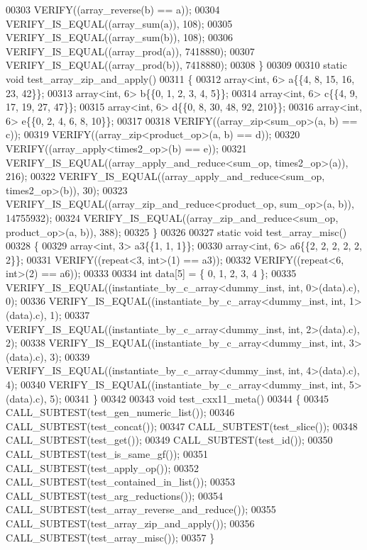 \begin{DoxyCode}
00303   VERIFY((array\_reverse(b) == a));
00304   VERIFY\_IS\_EQUAL((array\_sum(a)), 108);
00305   VERIFY\_IS\_EQUAL((array\_sum(b)), 108);
00306   VERIFY\_IS\_EQUAL((array\_prod(a)), 7418880);
00307   VERIFY\_IS\_EQUAL((array\_prod(b)), 7418880);
00308 \}
00309 
00310 \textcolor{keyword}{static} \textcolor{keywordtype}{void} test\_array\_zip\_and\_apply()
00311 \{
00312   array<int, 6> a\{\{4, 8, 15, 16, 23, 42\}\};
00313   array<int, 6> b\{\{0, 1, 2, 3, 4, 5\}\};
00314   array<int, 6> c\{\{4, 9, 17, 19, 27, 47\}\};
00315   array<int, 6> d\{\{0, 8, 30, 48, 92, 210\}\};
00316   array<int, 6> e\{\{0, 2, 4, 6, 8, 10\}\};
00317 
00318   VERIFY((array\_zip<sum\_op>(a, b) == c));
00319   VERIFY((array\_zip<product\_op>(a, b) == d));
00320   VERIFY((array\_apply<times2\_op>(b) == e));
00321   VERIFY\_IS\_EQUAL((array\_apply\_and\_reduce<sum\_op, times2\_op>(a)), 216);
00322   VERIFY\_IS\_EQUAL((array\_apply\_and\_reduce<sum\_op, times2\_op>(b)), 30);
00323   VERIFY\_IS\_EQUAL((array\_zip\_and\_reduce<product\_op, sum\_op>(a, b)), 14755932);
00324   VERIFY\_IS\_EQUAL((array\_zip\_and\_reduce<sum\_op, product\_op>(a, b)), 388);
00325 \}
00326 
00327 \textcolor{keyword}{static} \textcolor{keywordtype}{void} test\_array\_misc()
00328 \{
00329   array<int, 3> a3\{\{1, 1, 1\}\};
00330   array<int, 6> a6\{\{2, 2, 2, 2, 2, 2\}\};
00331   VERIFY((repeat<3, int>(1) == a3));
00332   VERIFY((repeat<6, int>(2) == a6));
00333 
00334   \textcolor{keywordtype}{int} data[5] = \{ 0, 1, 2, 3, 4 \};
00335   VERIFY\_IS\_EQUAL((instantiate\_by\_c\_array<dummy\_inst, int, 0>(data).c), 0);
00336   VERIFY\_IS\_EQUAL((instantiate\_by\_c\_array<dummy\_inst, int, 1>(data).c), 1);
00337   VERIFY\_IS\_EQUAL((instantiate\_by\_c\_array<dummy\_inst, int, 2>(data).c), 2);
00338   VERIFY\_IS\_EQUAL((instantiate\_by\_c\_array<dummy\_inst, int, 3>(data).c), 3);
00339   VERIFY\_IS\_EQUAL((instantiate\_by\_c\_array<dummy\_inst, int, 4>(data).c), 4);
00340   VERIFY\_IS\_EQUAL((instantiate\_by\_c\_array<dummy\_inst, int, 5>(data).c), 5);
00341 \}
00342 
00343 \textcolor{keywordtype}{void} test\_cxx11\_meta()
00344 \{
00345   CALL\_SUBTEST(test\_gen\_numeric\_list());
00346   CALL\_SUBTEST(test\_concat());
00347   CALL\_SUBTEST(test\_slice());
00348   CALL\_SUBTEST(test\_get());
00349   CALL\_SUBTEST(test\_id());
00350   CALL\_SUBTEST(test\_is\_same\_gf());
00351   CALL\_SUBTEST(test\_apply\_op());
00352   CALL\_SUBTEST(test\_contained\_in\_list());
00353   CALL\_SUBTEST(test\_arg\_reductions());
00354   CALL\_SUBTEST(test\_array\_reverse\_and\_reduce());
00355   CALL\_SUBTEST(test\_array\_zip\_and\_apply());
00356   CALL\_SUBTEST(test\_array\_misc());
00357 \}
\end{DoxyCode}
